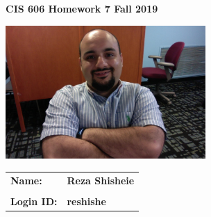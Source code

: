 \documentclass[11pt]{article}
\begin{document}
\thispagestyle{plain}

\begin{center}
{\Large \bf CIS 606 \hfil Homework 7 \hfil Fall 2019} \\%
\end{center}

\vskip 1in 

\centerline{\includegraphics[width=3in]{photo.jpg}}

\vskip 0.5in 


\begin{center}
\begin{tabular}{ll}
{\bf Name:}     & {\bf Reza Shisheie } \\ \\
{\bf Login ID:} & {\bf reshishe }   
\end{tabular}
\end{center}

\newpage
\end{document}
